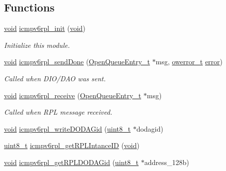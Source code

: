 \subsection*{Functions}
\begin{DoxyCompactItemize}
\item 
\hyperlink{usb__devapi_8h_afabf60e7f57651d6d595a02c75f07cd0}{void} \hyperlink{group___i_c_m_pv6_r_p_l_ga7bada18a4742103c7f3b726907cd0382}{icmpv6rpl\+\_\+init} (\hyperlink{usb__devapi_8h_afabf60e7f57651d6d595a02c75f07cd0}{void})
\begin{DoxyCompactList}\small\item\em Initialize this module. \end{DoxyCompactList}\item 
\hyperlink{usb__devapi_8h_afabf60e7f57651d6d595a02c75f07cd0}{void} \hyperlink{group___i_c_m_pv6_r_p_l_ga849cd3fa4414d99ad68e9baf78c594b5}{icmpv6rpl\+\_\+send\+Done} (\hyperlink{struct_open_queue_entry__t}{Open\+Queue\+Entry\+\_\+t} $\ast$msg, \hyperlink{opendefs_8h_af20b7c3ed9d2ba19e56a309ad9314803}{owerror\+\_\+t} \hyperlink{disk_8c_ad018a3100b2dabad325a0800152db297}{error})
\begin{DoxyCompactList}\small\item\em Called when D\+I\+O/\+D\+AO was sent. \end{DoxyCompactList}\item 
\hyperlink{usb__devapi_8h_afabf60e7f57651d6d595a02c75f07cd0}{void} \hyperlink{group___i_c_m_pv6_r_p_l_ga6a943f6b83d94068c38bf9ed684719d9}{icmpv6rpl\+\_\+receive} (\hyperlink{struct_open_queue_entry__t}{Open\+Queue\+Entry\+\_\+t} $\ast$msg)
\begin{DoxyCompactList}\small\item\em Called when R\+PL message received. \end{DoxyCompactList}\item 
\hyperlink{usb__devapi_8h_afabf60e7f57651d6d595a02c75f07cd0}{void} \hyperlink{group___i_c_m_pv6_r_p_l_ga9c4de4d84eb79f63a40eb826fc9b8e50}{icmpv6rpl\+\_\+write\+D\+O\+D\+A\+Gid} (\hyperlink{_p_e___types_8h_aba7bc1797add20fe3efdf37ced1182c5}{uint8\+\_\+t} $\ast$dodagid)
\item 
\hyperlink{_p_e___types_8h_aba7bc1797add20fe3efdf37ced1182c5}{uint8\+\_\+t} \hyperlink{group___i_c_m_pv6_r_p_l_ga5679354a50817ec96688fbaab763822a}{icmpv6rpl\+\_\+get\+R\+P\+L\+Intance\+ID} (\hyperlink{usb__devapi_8h_afabf60e7f57651d6d595a02c75f07cd0}{void})
\item 
\hyperlink{usb__devapi_8h_afabf60e7f57651d6d595a02c75f07cd0}{void} \hyperlink{group___i_c_m_pv6_r_p_l_ga6724228f85310a8b3ad92bb39bf843f0}{icmpv6rpl\+\_\+get\+R\+P\+L\+D\+O\+D\+A\+Gid} (\hyperlink{_p_e___types_8h_aba7bc1797add20fe3efdf37ced1182c5}{uint8\+\_\+t} $\ast$address\+\_\+128b)

\end{DoxyCompactItemize}
